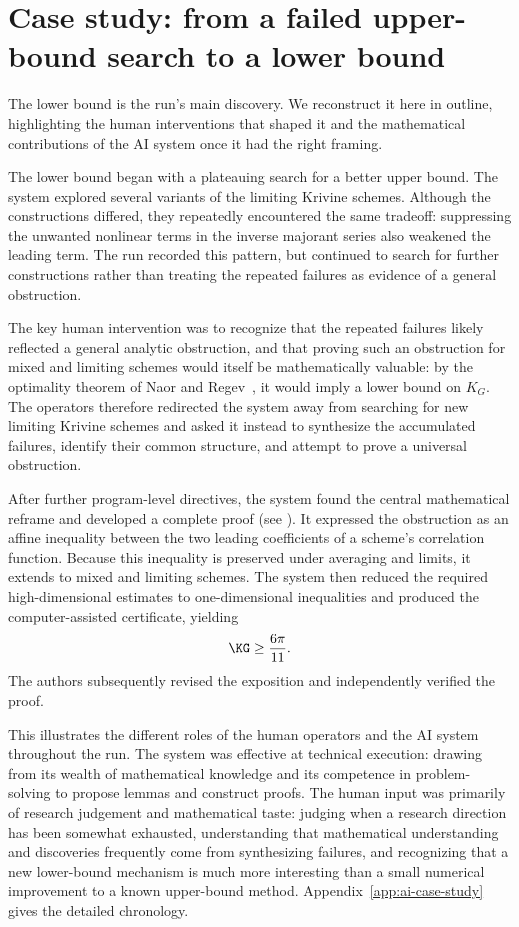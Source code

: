 \section{Case study: from a failed upper-bound search to a lower bound}
\label{sec:ai-case-study}

The lower bound is the run's main discovery. We reconstruct it here in
outline, highlighting the human interventions that shaped it and the
mathematical contributions of the AI system once it had the right framing.

The lower bound began with a plateauing search for a better upper bound.
The system explored several variants of the limiting Krivine schemes.
Although the constructions differed, they repeatedly encountered the same
tradeoff: suppressing the unwanted nonlinear terms in the inverse majorant
series also weakened the leading term. The run recorded this pattern, but
continued to search for further constructions rather than treating the
repeated failures as evidence of a general obstruction.


The key human intervention was to recognize that the repeated failures likely reflected a general analytic obstruction, and that proving such an obstruction for mixed and limiting schemes would itself be mathematically valuable: by the optimality theorem of Naor and Regev~\cite{naor2014krivine}, it would imply a lower bound on $K_G$. The operators therefore redirected the system away from searching for new limiting Krivine schemes and asked it instead to synthesize the accumulated failures, identify their common structure, and attempt to prove a universal obstruction.

After further program-level directives, the system found the central
mathematical reframe and developed a complete proof
(see \cite[Part~1]{saha2026new}). It expressed the obstruction as an affine
inequality between the two leading coefficients of a scheme's correlation
function. Because this
inequality is preserved under averaging and limits, it extends to mixed and
limiting schemes. The system then reduced the required high-dimensional
estimates to one-dimensional inequalities and produced the computer-assisted
certificate, yielding
\[
    \KG \geq \frac{6\pi}{11}.
\]
The authors subsequently revised the exposition and independently verified
the proof.

This illustrates the different roles of the human operators and the AI system throughout the run. The system was effective at technical execution: drawing from its wealth of mathematical knowledge and its competence in problem-solving to propose lemmas and construct proofs. The human input was primarily of research judgement and mathematical taste: judging when a research direction has been somewhat exhausted, understanding that mathematical understanding and discoveries frequently come from synthesizing failures, 
and recognizing that a new lower-bound mechanism is much more interesting than a small numerical improvement to a
known upper-bound method.
Appendix~\ref{app:ai-case-study} gives the
detailed chronology.


